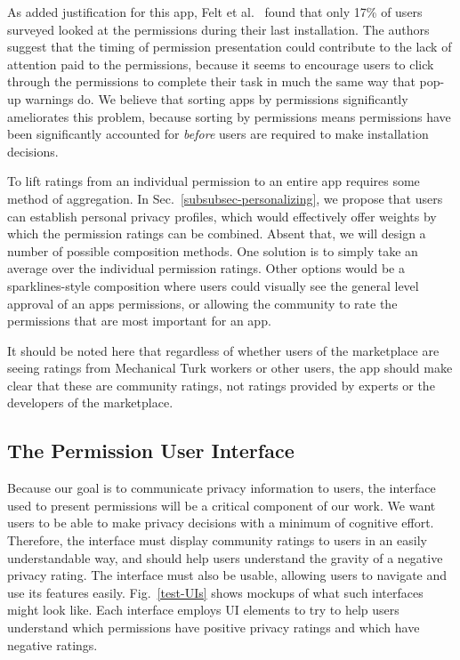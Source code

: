 \documentclass[11pt]{article}
\begin{document}
As added justification for this app, Felt et al.\ \cite{android-attention-SOUPS12} 
found that only 17\% of users surveyed looked at the permissions during
their last installation. The authors suggest that the timing of
permission presentation could contribute to the lack of attention paid
to the permissions, because it seems to encourage users to click
through the permissions to complete their task in much the same way
that pop-up warnings do. We believe that sorting apps by permissions
significantly ameliorates this problem, because sorting by permissions
means permissions have been significantly accounted for \emph{before}
users are required to make installation decisions.

To lift ratings from an individual permission to an entire app
requires some method of aggregation. In 
Sec.~\ref{subsubsec-personalizing}, we propose that users
can establish personal privacy profiles, which would effectively offer
weights by which the permission ratings can be combined. Absent that, we will design a
number of possible composition methods. One solution is to simply take
an average over the individual permission ratings. Other options would
be a sparklines-style composition where users could visually see the
general level approval of an apps permissions, or allowing the
community to rate the permissions that are most important for an app.

It should be noted here that regardless of whether users of the
marketplace are seeing ratings from Mechanical Turk workers or other
users, the app should make clear that these are community ratings, not
ratings provided by experts or the developers of the marketplace.


\subsection{The Permission User Interface}
\label{subsec-perm-ui}

Because our goal is to communicate privacy information to users, the
interface used to present permissions will be a critical component of
our work. We want users to be able to make privacy decisions with a
minimum of cognitive effort. Therefore, the interface must display community
ratings to users in an easily understandable way, and should help
users understand the gravity of a negative privacy rating. The
interface must also be usable, allowing users to navigate and use its
features easily. Fig.~\ref{test-UIs} shows mockups of what such
interfaces might look like. Each interface employs UI elements to try
to help
users understand which permissions have positive privacy
ratings and which have negative ratings.
\end{document}
